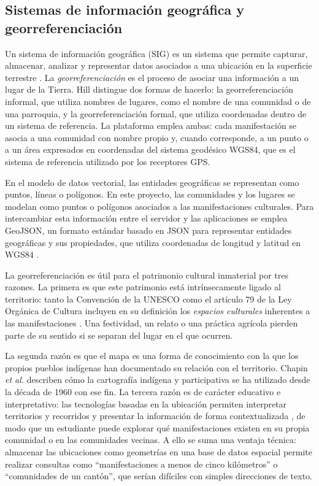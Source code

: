 \subsection{Sistemas de información geográfica y georreferenciación}
Un sistema de información geográfica (SIG) es un sistema que permite capturar, almacenar, analizar y representar datos asociados a una ubicación en la superficie terrestre \cite{longley2015gis}. La \textit{georreferenciación} es el proceso de asociar una información a un lugar de la Tierra. Hill \cite{hill2006georeferencing} distingue dos formas de hacerlo: la georreferenciación informal, que utiliza nombres de lugares, como el nombre de una comunidad o de una parroquia, y la georreferenciación formal, que utiliza coordenadas dentro de un sistema de referencia. La plataforma emplea ambas: cada manifestación se asocia a una comunidad con nombre propio y, cuando corresponde, a un punto o a un área expresados en coordenadas del sistema geodésico WGS84, que es el sistema de referencia utilizado por los receptores GPS.

En el modelo de datos vectorial, las entidades geográficas se representan como puntos, líneas o polígonos. En este proyecto, las comunidades y los lugares se modelan como puntos o polígonos asociados a las manifestaciones culturales. Para intercambiar esta información entre el servidor y las aplicaciones se emplea GeoJSON, un formato estándar basado en JSON para representar entidades geográficas y sus propiedades, que utiliza coordenadas de longitud y latitud en WGS84 \cite{butler2016geojson}.

La georreferenciación es útil para el patrimonio cultural inmaterial por tres razones. La primera es que este patrimonio está intrínsecamente ligado al territorio: tanto la Convención de la UNESCO como el artículo 79 de la Ley Orgánica de Cultura incluyen en su definición los \textit{espacios culturales} inherentes a las manifestaciones \cite{unesco2003convencion,ecuador2016cultura}. Una festividad, un relato o una práctica agrícola pierden parte de su sentido si se separan del lugar en el que ocurren.

La segunda razón es que el mapa es una forma de conocimiento con la que los propios pueblos indígenas han documentado su relación con el territorio. Chapin \textit{et al.} \cite{chapin2005mapping} describen cómo la cartografía indígena y participativa se ha utilizado desde la década de 1960 con ese fin. La tercera razón es de carácter educativo e interpretativo: las tecnologías basadas en la ubicación permiten interpretar territorios y recorridos y presentar la información de forma contextualizada \cite{gretzel2015smart}, de modo que un estudiante puede explorar qué manifestaciones existen en su propia comunidad o en las comunidades vecinas. A ello se suma una ventaja técnica: almacenar las ubicaciones como geometrías en una base de datos espacial permite realizar consultas como ``manifestaciones a menos de cinco kilómetros'' o ``comunidades de un cantón'', que serían difíciles con simples direcciones de texto.

